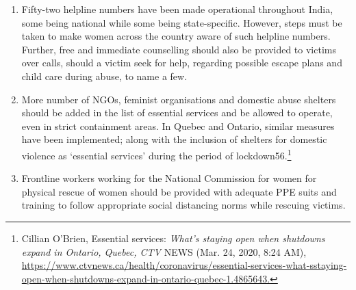 \begin{multicols}{2}
\begin{enumerate}
Several media sources reported that the Police in Gardai, Ireland, have launched
‘Operation Faoiseamh’, so as to contact every domestic abuse victim proactively,
those who had previously contacted the police about any domestic abuse, with an
immediate arrest policy54.\footnote{\textit{Operation Faoiseamh}, AN GARDA SIOCHANA (Jun. 09, 2020), \url{https://www.garda.ie/en/about-us/ourdepartments/office-of-corporate-communications/press-releases/2020/june/operation}\%20faoiseamh\%20-
\%20domestic\%20abuse\%209th\%20june\%202020\%20.html.} Similar measures have been undertaken by the police in
Odisha and Tamil Nadu. The Canada government is lending cell-phones and free
services to vulnerable people. Civil societies have tied up with Uber to provide free
emergency rides for victims.\footnote{Meg Black, \textit{Uber Offers Free Rides for People Fleeing Domestic Violence During COVID-19 Pandemic},
GLOBAL CITIZEN (Apr. 29, 2020), \url{https://www.globalcitizen.org/en/content/uber-offers-free-ries-for-peoplefleeing-domestic/.}}

In India, government authorities can learn from the same and adopt such innovative
initiatives as well as take the support from the private sector to scale up the initiatives. 

\item Fifty-two helpline numbers have been made operational throughout India, some being
national while some being state-specific. However, steps must be taken to make
women across the country aware of such helpline numbers. Further, free and
immediate counselling should also be provided to victims over calls, should a victim
seek for help, regarding possible escape plans and child care during abuse, to name a
few. 

\item More number of NGOs, feminist organisations and domestic abuse shelters should be
added in the list of essential services and be allowed to operate, even in strict
containment areas. In Quebec and Ontario, similar measures have been implemented;
along with the inclusion of shelters for domestic violence as ‘essential services’
during the period of lockdown56.\footnote{Cillian O’Brien, Essential services: \textit{What's staying open when shutdowns expand in Ontario, Quebec, CTV}
NEWS (Mar. 24, 2020, 8:24 AM), \url{https://www.ctvnews.ca/health/coronavirus/essential-services-what-sstaying-open-when-shutdowns-expand-in-ontario-quebec-1.4865643.}}

\item Frontline workers working for the National Commission for women for physical
rescue of women should be provided with adequate PPE suits and training to follow
appropriate social distancing norms while rescuing victims.


\end{enumerate}
\end{multicols}
